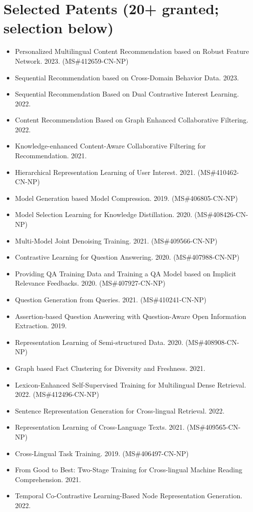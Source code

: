 \documentclass[10.5pt,letterpaper]{article}
\begin{document}
\section*{Selected Patents (20+ granted; selection below)}
\begin{itemize}[leftmargin=1.1em, itemsep=0pt, topsep=1pt, parsep=0pt]
  \item Personalized Multilingual Content Recommendation based on Robust Feature Network. 2023. (MS\#412659-CN-NP)
  \item Sequential Recommendation based on Cross-Domain Behavior Data. 2023.
  \item Sequential Recommendation Based on Dual Contrastive Interest Learning. 2022.
  \item Content Recommendation Based on Graph Enhanced Collaborative Filtering. 2022.
  \item Knowledge-enhanced Content-Aware Collaborative Filtering for Recommendation. 2021.
  \item Hierarchical Representation Learning of User Interest. 2021. (MS\#410462-CN-NP)
  \item Model Generation based Model Compression. 2019. (MS\#406805-CN-NP)
  \item Model Selection Learning for Knowledge Distillation. 2020. (MS\#408426-CN-NP)
  \item Multi-Model Joint Denoising Training. 2021. (MS\#409566-CN-NP)
  \item Contrastive Learning for Question Answering. 2020. (MS\#407988-CN-NP)
  \item Providing QA Training Data and Training a QA Model based on Implicit Relevance Feedbacks. 2020. (MS\#407927-CN-NP)
  \item Question Generation from Queries. 2021. (MS\#410241-CN-NP)
  \item Assertion-based Question Answering with Question-Aware Open Information Extraction. 2019.
  \item Representation Learning of Semi-structured Data. 2020. (MS\#408908-CN-NP)
  \item Graph based Fact Clustering for Diversity and Freshness. 2021.
  \item Lexicon-Enhanced Self-Supervised Training for Multilingual Dense Retrieval. 2022. (MS\#412496-CN-NP)
  \item Sentence Representation Generation for Cross-lingual Retrieval. 2022.
  \item Representation Learning of Cross-Language Texts. 2021. (MS\#409565-CN-NP)
  \item Cross-Lingual Task Training. 2019. (MS\#406497-CN-NP)
  \item From Good to Best: Two-Stage Training for Cross-lingual Machine Reading Comprehension. 2021.
  \item Temporal Co-Contrastive Learning-Based Node Representation Generation. 2022.
\end{itemize}
\end{document}
